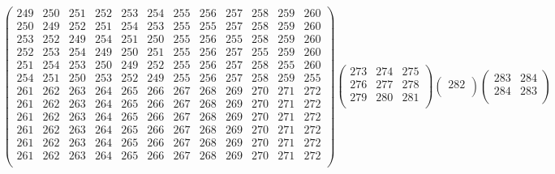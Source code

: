 \documentclass[12pt,a4paper]{amsart}
\begin{document}
\begin{align*}
\left(\begin{array}{rrrrrr|rrrrrr}%
249&250&251&252&253&254&255&256&257&258&259&260\\%
250&249&252&251&254&253&255&255&257&258&259&260\\%
253&252&249&254&251&250&255&256&255&258&259&260\\%
252&253&254&249&250&251&255&256&257&255&259&260\\%
251&254&253&250&249&252&255&256&257&258&255&260\\%
254&251&250&253&252&249&255&256&257&258&259&255\\%
\hline
261&262&263&264&265&266&267&268&269&270&271&272\\%
261&262&263&264&265&266&267&268&269&270&271&272\\%
261&262&263&264&265&266&267&268&269&270&271&272\\%
261&262&263&264&265&266&267&268&269&270&271&272\\%
261&262&263&264&265&266&267&268&269&270&271&272\\%
261&262&263&264&265&266&267&268&269&270&271&272\\%
\end{array}\right)%
\left(\begin{array}{r|r|r}%
273&274&275\\%
\hline
276&277&278\\%
\hline
279&280&281\\%
\end{array}\right)%
\left(\begin{array}{r}%
282\\%
\end{array}\right)%
\left(\begin{array}{rr}%
283&284\\%
284&283\\%
\end{array}\right)%
\end{align*}
\end{document}
